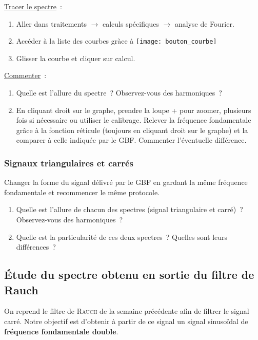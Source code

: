 \documentclass[a4paper, 11pt, final, garamond]{book}
\begin{document}
\underline{Tracer le spectre}~: \bigbreak
\begin{enumerate}
    \item Aller dans traitements $\rightarrow$ calculs spécifiques $\rightarrow$
        analyse de Fourier.
    \item Accéder à la liste des courbes gràce à
        \texttt{[image: bouton\_courbe]}
    \item Glisser la courbe et cliquer sur calcul.
\end{enumerate} \bigbreak
	
\underline{Commenter}~: \bigbreak
\begin{enumerate}[resume, label=\sqenumi]
    \item Quelle est l'allure du spectre~? Observez-vous des harmoniques~?
    \item En cliquant droit sur le graphe, prendre la loupe + pour zoomer,
        plusieurs fois si nécessaire ou utiliser le calibrage. Relever la
        fréquence fondamentale grâce à la fonction réticule (toujours en
        cliquant droit sur le graphe) et la comparer à celle indiquée par le
        GBF. Commenter l'éventuelle différence. 
\end{enumerate}

\subsubsection{Signaux triangulaires et carrés}

Changer la forme du signal délivré par le GBF en gardant la même fréquence
fondamentale et recommencer le même protocole. \bigbreak

\begin{enumerate}[resume, label=\sqenumi]
    \item Quelle est l'allure de chacun des spectres (signal triangulaire et
        carré)~? Observez-vous des harmoniques~?
    \item Quelle est la particularité de ces deux spectres~? Quelles sont leurs
        différences~?
\end{enumerate}

\subsection{Étude du spectre obtenu en sortie du filtre de Rauch}

On reprend le filtre de \textsc{Rauch} de la semaine précédente afin de filtrer
le signal carré. Notre objectif est d'obtenir à partir de ce signal un signal
sinusoïdal de \textbf{fréquence fondamentale double}. 
\end{document}
